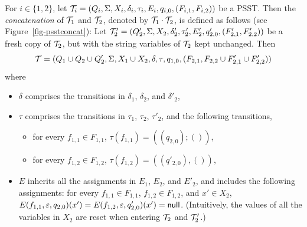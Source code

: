 \begin{definition}\label{def-psstconcat}
For $i \in \{1,2\}$, let $\mathcal{T}_i = (Q_i, \Sigma, X_i, \delta_i, \tau_i, E_i, q_{i,0}, (F_{i,1}, F_{i,2}))$ be a PSST. Then the \emph{concatenation} of $\mathcal{T}_1$ and $\mathcal{T}_2$, denoted by $\mathcal{T}_1 \cdot \mathcal{T}_2$, is defined as follows (see Figure~\ref{fig-psstconcat}): 
Let  
$\mathcal{T}'_{2} = (Q'_{2}, \Sigma, X_{2}, \delta'_{2}, \tau'_{2}, E_{2}', q'_{2,0}, (F'_{2, 1}, F'_{2,2}))$ be a fresh copy of $\mathcal{T}_{2}$, but with the string variables of $\mathcal{T}_{2}$ kept unchanged. 
Then 
%
\[\mathcal{T} = ( Q_{1} \cup Q_{2} \cup Q'_{2}, \Sigma, X_1 \cup X_2, \delta, \tau, q_{1,0}, (F_{2,1}, F_{2,2} \cup F'_{2,1} \cup F'_{2,2}))\] 
where 
	\begin{itemize}
	\item $\delta$ comprises the transitions in $\delta_1$, $\delta_2$, and $\delta'_2$,
%
	\item $\tau$ comprises the transitions in $\tau_1$, $\tau_2$, $\tau'_2$, and the following transitions,
	\begin{itemize}
%
	\item for every $f_{1,1} \in F_{1,1}$, $\tau(f_{1,1}) = ((q_{2,0}); ())$, 
%
	\item for every $f_{1,2} \in F_{1,2}$, $\tau(f_{1,2}) = ((q'_{2,0}), ())$,
	\end{itemize}
	\item $E$ inherits all the assignments in $E_1$, $E_2$, and $E'_2$, and includes the following assignments:  for every $f_{1,1} \in F_{1,1}$, $f_{1,2} \in F_{1,2}$, and $x' \in X_2$, $E(f_{1,1}, \varepsilon, q_{2,0})(x') = E(f_{1,2}, \varepsilon, q'_{2,0})(x')= \mathsf{null}$. (Intuitively, the values of all the variables in $X_2$ are reset when entering $\mathcal{T}_2$ and $\mathcal{T}'_2$.)
  \end{itemize}
		\begin{figure}[tb]

\end{figure}
\end{definition}
